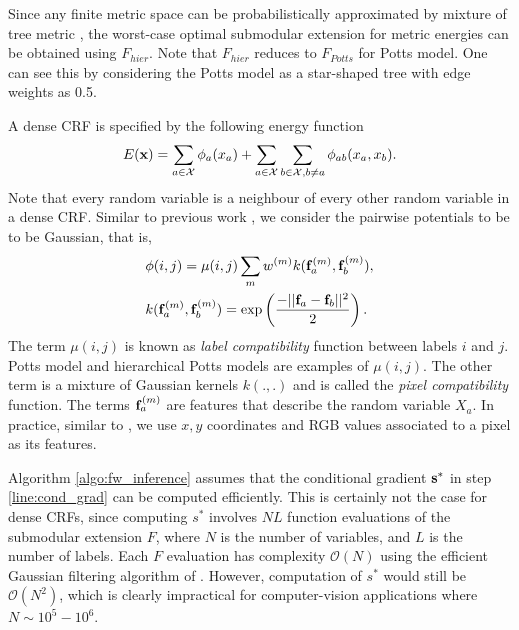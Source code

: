 Since any finite metric space can be probabilistically approximated by mixture
of tree metric \citep{bartal1996probabilistic}, the worst-case optimal
submodular extension for metric energies can be obtained using $F_{hier}$. Note
that $F_{hier}$ reduces to $F_{Potts}$ for Potts model. One can see this by
considering the Potts model as a star-shaped tree with edge weights as 0.5.

\label{subsec:dense_crf}

 A dense CRF is specified by the following energy function 
\begin{equation}
    E({\bf x}) = \sum_{a \in {\mathcal X}} \phi_a(x_a) + \sum_{a \in {\mathcal X}} \sum_{b \in {\mathcal X}, b \neq a} \phi_{ab}(x_a, x_b).
\end{equation}
Note that every random variable is a neighbour of every other random variable in a dense CRF. Similar to previous work \citep{koltun2011efficient}, we consider the pairwise potentials to be to be Gaussian, that is, 
\begin{align}
    &\phi(i, j) = \mu(i, j) \sum_{m} w^{(m)} k({\bf f}_a^{(m)}, {\bf f}_b^{(m)}), \\
    &k({\bf f}_a^{(m)}, {\bf f}_b^{(m)}) = \exp\left( \frac{- ||{\bf f}_a - {\bf f}_b ||^2}{2} \right).
\end{align}
The term $\mu(i,j)$ is known as {\it label compatibility} function between
labels $i$ and $j$. Potts model and hierarchical Potts models are examples of
$\mu(i, j)$. The other term is a mixture of Gaussian kernels $k(.,.)$ and is
called the {\it pixel compatibility} function. The terms ${\bf f}_a^{(m)}$ are
features that describe the random variable $X_a$. In practice, similar to
\citep{koltun2011efficient}, we use $x, y$ coordinates and RGB values
associated to a pixel as its features.

Algorithm \ref{algo:fw_inference} assumes that the conditional gradient $\bf s^*$ in step {\ref{line:cond_grad}} can be computed efficiently. This is certainly not the case for dense CRFs, since computing $s^*$ involves $NL$ function evaluations of the submodular extension $F$, where $N$ is the number of variables, and $L$ is the number of labels. Each $F$ evaluation has complexity ${\mathcal O}(N)$ using the efficient Gaussian filtering algorithm of \citep{koltun2011efficient}. However, computation of $s^*$ would still be ${\mathcal O} (N^2)$, which is clearly impractical for computer-vision applications where $N \sim 10^5 - 10^6$.

